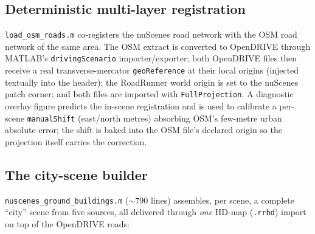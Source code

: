 \documentclass[11pt]{article}
\newcommand{\code}[1]{{\setlength{\fboxsep}{1.5pt}\colorbox{codegray}{\small\texttt{#1}}}}
\newcommand{\file}[1]{\texttt{#1}}
\begin{document}
\subsection{Deterministic multi-layer registration}
\file{load\_osm\_roads.m} co-registers the nuScenes road network with the OSM road
network of the same area. The OSM extract is converted to OpenDRIVE through MATLAB's
\code{drivingScenario} importer/exporter; both OpenDRIVE files then receive a real
transverse-mercator \code{geoReference} at their local origins (injected textually into
the header); the RoadRunner world origin is set to the nuScenes patch corner; and both
files are imported with \code{FullProjection}. A diagnostic overlay figure predicts the
in-scene registration and is used to calibrate a per-scene \code{manualShift}
(east/north metres) absorbing OSM's few-metre urban absolute error; the shift is baked
into the OSM file's declared origin so the projection itself carries the correction.

\subsection{The city-scene builder}
\file{nuscenes\_ground\_buildings.m} ($\sim$790 lines) assembles, per scene, a complete
``city'' scene from five sources, all delivered through \emph{one} HD-map
(\file{.rrhd}) import on top of the OpenDRIVE roads:
\end{document}
